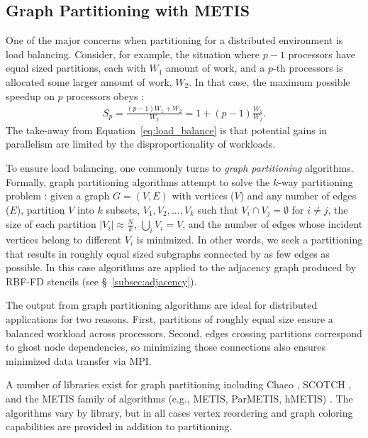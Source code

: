 \documentclass{report}
\begin{document}
\subsection{Graph Partitioning with METIS}

One of the major concerns when partitioning for a distributed environment is load balancing. Consider, for example, the situation where $p-1$ processors have equal sized partitions, each with $W_1$ amount of work, and a $p$-th processors is allocated some larger amount of work, $W_2$. In that case, the maximum possible speedup on $p$ processors obeys \cite{Gropp1990}:  
\begin{align}
S_p = \frac{(p-1) W_1 + W_2}{W_2} = 1 + (p-1)\frac{W_1}{W_2}.
\label{eq:load_balance}
\end{align}
The take-away from Equation~\ref{eq:load_balance} is that potential gains in parallelism are limited by the disproportionality of workloads. 

To ensure load balancing, one commonly turns to \emph{graph partitioning} algorithms. Formally, graph partitioning algorithms attempt to solve the $k$-way partitioning problem \cite{Karypis1999}: given a graph $G = (V,E)$ with vertices ($V$) and any number of edges ($E$), partition $V$ into $k$ subsets, $V_1, V_2, ..., V_k$ such that $V_i \cap V_j = \emptyset$ for $i \neq j$, the size of each partition $|V_i| \approx \frac{N}{k}$, $\bigcup_i V_i = V$, and the number of edges whose incident vertices belong to different $V_i$ is minimized. In other words, we seek a partitioning that results in roughly equal sized subgraphs connected by as few edges as possible. In this case algorithms are applied to the adjacency graph produced by RBF-FD stencils (see \S~\ref{subsec:adjacency}).

The output from graph partitioning algorithms are ideal for distributed applications for two reasons. First, partitions of roughly equal size ensure a balanced workload across processors. Second, edges crossing partitions correspond to ghost node dependencies, so minimizing those connections also ensures minimized data transfer via MPI. 

A number of libraries exist for graph partitioning including Chaco \cite{CHACO1995}, SCOTCH \cite{SCOTCH1996}, and the METIS family of algorithms (e.g., METIS, ParMETIS, hMETIS) \cite{Karypis1999}. The algorithms vary by library, but in all cases vertex reordering and graph coloring capabilities are provided in addition to partitioning. %
\end{document}

